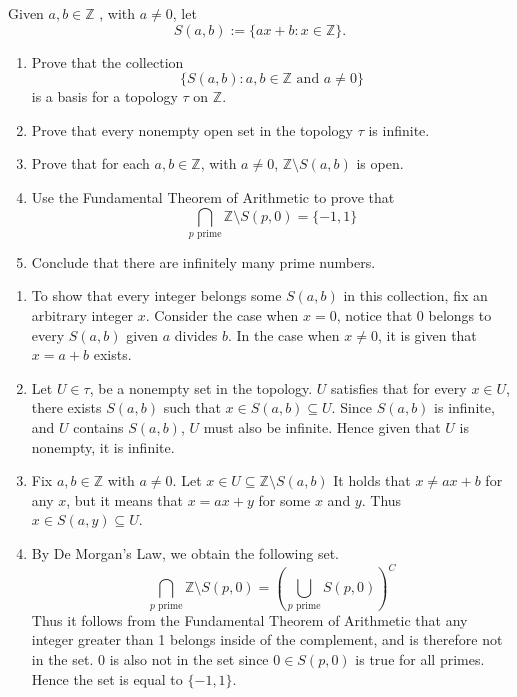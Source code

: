\documentclass[../main.tex]{subfiles}
\begin{document}
\begin{problem}[10]
    Given $a, b \in \mathbb{Z}$ , with $a \ne 0$, let
    \[
        S(a, b) := \{ ax + b : x \in \mathbb{Z} \}.
    \]
    \begin{enumerate}[label=(\alph*)]
        \item Prove that the collection
            \[
                \{ S(a, b) : a, b \in \mathbb{Z} \text{ and } a \ne 0 \}
            \]
            is a basis for a topology $\tau$ on $\mathbb{Z}$.
        \item Prove that every nonempty open set in the topology $\tau$ is infinite.
        \item Prove that for each $a, b \in \mathbb{Z}$, with $a \ne 0$, $\mathbb{Z} \setminus S(a, b)$ is open.
        \item Use the Fundamental Theorem of Arithmetic to prove that
            \[ \bigcap_{p \text{ prime}} \mathbb{Z} \setminus S(p, 0) = \{ -1, 1 \} \]
        \item Conclude that there are infinitely many prime numbers.
    \end{enumerate}
\end{problem}
\begin{enumerate}[label=(\alph*)]
    \item To show that every integer belongs some $S(a, b)$ in this collection,
        fix an arbitrary integer $x$.
        Consider the case when $x = 0$, notice that $0$ belongs to every $S(a, b)$ given $a$ divides $b$.
        In the case when $x \ne 0$, it is given that $x = a + b$ exists.
    \item Let $U \in \tau$, be a nonempty set in the topology.
        $U$ satisfies that for every $x \in U$, there exists $S(a, b)$ such that $x \in S(a, b) \subseteq U$.
        Since $S(a, b)$ is infinite, and $U$ contains $S(a, b)$, $U$ must also be infinite.
        Hence given that $U$ is nonempty, it is infinite.
    \item Fix $a, b \in \mathbb{Z}$ with $a \ne 0$.
        Let $x \in U \subseteq \mathbb{Z} \setminus S(a, b)$
        It holds that $x \ne ax + b$ for any $x$, but it means that $x = ax + y$ for some $x$ and $y$.
        Thus $x \in S(a, y) \subseteq U$.
    \item By De Morgan's Law, we obtain the following set.
        \[
            \bigcap_{p \text{ prime}} \mathbb{Z} \setminus S(p, 0)
            = \left( \bigcup_{p \text{ prime}} S(p, 0) \right)^C
        \]
        Thus it follows from the Fundamental Theorem of Arithmetic that any integer greater than 1 belongs inside of the complement, and is therefore not in the set.
        0 is also not in the set since $0 \in S(p, 0)$ is true for all primes.
        Hence the set is equal to $\{ -1, 1\}$.
\end{enumerate}
\end{document}
